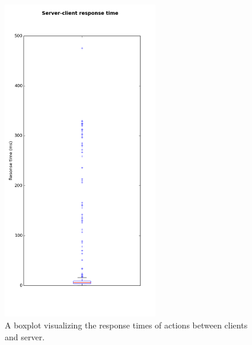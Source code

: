 		\begin{figure}[h!]
		  \centering
		    \includegraphics[width=0.6\textwidth, height=0.59\textheight]{images/boxplot_response_times}
		    
		  \caption{A boxplot visualizing the response times of actions between clients and server.}
		  \label{fig:boxplot_response_times}
		\end{figure}
		
